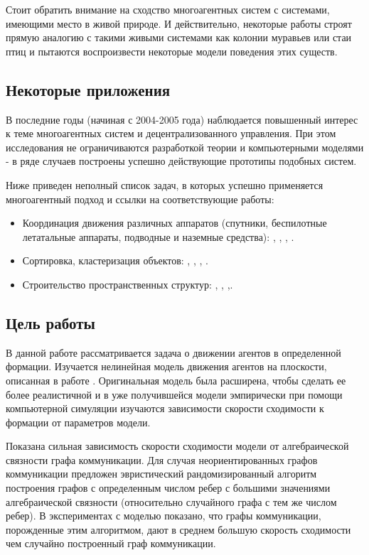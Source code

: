 Стоит обратить внимание на сходство многоагентных систем с системами, имеющими место в живой природе. И действительно, некоторые работы строят прямую аналогию с  такими живыми системами как колонии муравьев или стаи птиц и пытаются воспроизвести некоторые модели поведения этих существ.

\subsection*{Некоторые приложения}

В последние годы (начиная с 2004-2005 года) наблюдается
повышенный интерес к теме многоагентных систем и
децентрализованного управления. При этом исследования
не ограничиваются разработкой теории и компьютерными
моделями - в ряде случаев построены успешно
действующие прототипы подобных систем. 

Ниже приведен неполный список задач, в которых успешно  применяется многоагентный подход и ссылки на соответствующие работы:
\begin{itemize}
\item Координация движения различных аппаратов (спутники, беспилотные летатальные аппараты, подводные и наземные средства): \cite{lafferriere2005decentralized}, \cite{veerman2005flocks}, \cite{vasarhelyi2014outdoor}, \cite{williams2005stable}.
\item Сортировка, кластеризация объектов: \cite{deneubourg1991dynamics}, \cite{ding2014sorting}, \cite{kabla2012collective}, \cite{santos2014segregation}.
\item Строительство пространственных структур: \cite{pennisi2014cooperative}, \cite{petersen2014collective}, \cite{augugliaro2013building},\cite{lindsey2011construction}.
\end{itemize}

\subsection*{Цель работы}

В данной работе рассматривается задача о движении агентов в определенной формации. Изучается нелинейная модель движения агентов на плоскости, описанная в работе \cite{veerman2005flocks}. Оригинальная модель была расширена, чтобы сделать ее более реалистичной и в уже получившейся модели эмпирически при помощи компьютерной симуляции изучаются зависимости скорости сходимости к формации от параметров модели. 

Показана сильная зависимость скорости сходимости модели от алгебраической связности графа коммуникации. Для случая неориентированных графов коммуникации предложен эвристический рандомизированный алгоритм построения графов с определенным числом ребер с большими значениями алгебраической связности (относительно случайного графа с тем же числом ребер). В экспериментах с моделью показано, что графы коммуникации, порожденные этим алгоритмом, дают в среднем б\emph{о}льшую скорость сходимости чем случайно построенный граф коммуникации.

